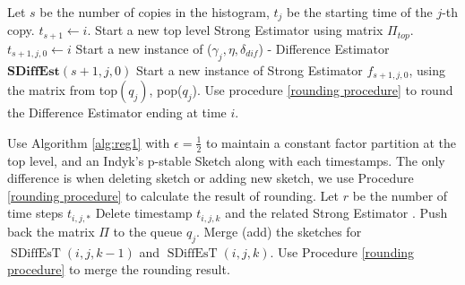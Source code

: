 \documentclass{article}
\newcommand{\est}{\textsf{Strong Estimator }}
\newcommand{\ind}{\textsf{Indyk's p-stable Sketch }}
\newcommand{\dif}{\textsf{Difference Estimator }}
\theoremstyle{plain}
\begin{document}
\begin{algorithm}[H]
\begin{algorithmic}[1]
\State Let $s$ be the number of copies in the histogram, $t_j$ be the starting time of the $j$-th copy.
\State $t_{s+1} \gets i$.
\State Start a new top level \est using matrix $\Pi_{top}$.
 
    \State $t_{s + 1, j, 0} \gets i$
    \State Start a new instance of ($\gamma_j, \eta, \delta_{dif}$) - \dif $\textbf{SDiffEst}(s + 1, j, 0)$ 
    \State Start a new instance of \est $f_{s + 1, j, 0}$, using the matrix from top$(q_j)$, pop($q_j$).
    \State Use procedure \ref{rounding procedure} to round the \dif ending at time $i$. 
\EndFor
\EndFunction
\end{algorithmic}
\end{algorithm}


\begin{algorithm}[H]
\begin{algorithmic}[1]

\State Use Algorithm \ref{alg:reg1} with $\epsilon = \frac 12$ to maintain a constant factor partition at the top level, and an \ind along with each timestamps. The only difference is when deleting sketch or adding new sketch, we use Procedure \ref{rounding procedure} to calculate the result of rounding.
 
    \State Let $r$ be the number of time steps $t_{i, j, *}$
         
                \State Delete timestamp $t_{i, j, k}$ and the related \est. 
                \State Push back the matrix $\Pi$ to the queue $q_j$.
                \State Merge (add) the sketches for $\operatorname{SDiffEsT}(i, j, k -1)$  and $\operatorname{SDiffEsT}(i, j, k)$. 
                \State Use Procedure \ref{rounding procedure} to merge the rounding result.

                
\EndIf
        \EndIf
    \EndFor
\EndFor
\EndFunction
\end{algorithmic}
\end{algorithm}
\end{document}
